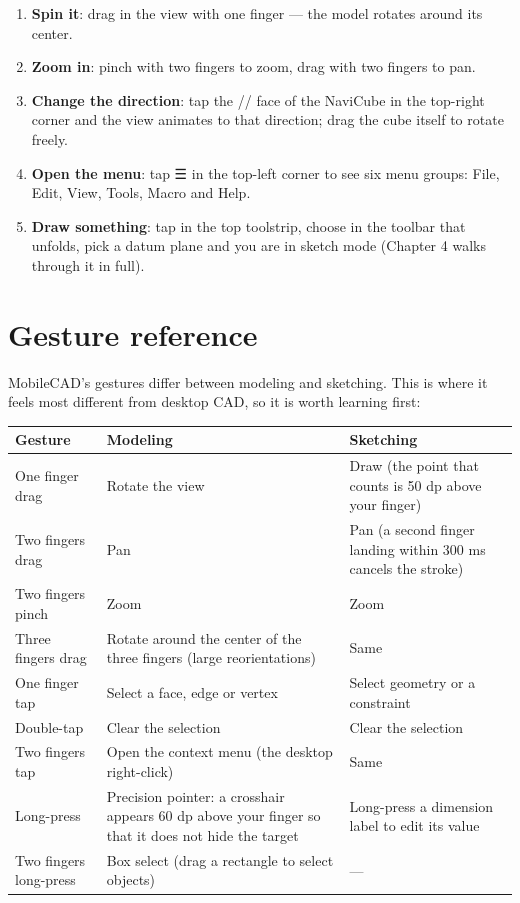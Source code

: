 \begin{enumerate}
  \item \textbf{Spin it}: drag in the view with one finger — the model rotates around its center.
  \item \textbf{Zoom in}: pinch with two fingers to zoom, drag with two fingers to pan.
  \item \textbf{Change the direction}: tap the // face of the NaviCube in the
        top-right corner and the view animates to that direction; drag the cube itself to rotate freely.
  \item \textbf{Open the menu}: tap ☰ in the top-left corner to see six menu groups: File, Edit, View, Tools,
        Macro and Help.
  \item \textbf{Draw something}: tap  in the top toolstrip, choose  in the toolbar
        that unfolds, pick a datum plane and you are in sketch mode (Chapter 4 walks through it in full).
\end{enumerate}

\section{Gesture reference}

MobileCAD's gestures differ between modeling and sketching. This is where it feels most different from
desktop CAD, so it is worth learning first:

\begin{center}
\small
\begin{tabularx}{\linewidth}{@{}lXX@{}}
\toprule
\textbf{Gesture} & \textbf{Modeling} & \textbf{Sketching} \\
\midrule
One finger drag & Rotate the view & Draw (the point that counts is 50 dp above your finger) \\
Two fingers drag & Pan & Pan (a second finger landing within 300 ms cancels the stroke) \\
Two fingers pinch & Zoom & Zoom \\
Three fingers drag & Rotate around the center of the three fingers (large reorientations) & Same \\
One finger tap & Select a face, edge or vertex & Select geometry or a constraint \\
Double-tap & Clear the selection & Clear the selection \\
Two fingers tap & Open the context menu (the desktop right-click) & Same \\
Long-press & Precision pointer: a crosshair appears 60 dp above your finger so that it does not hide the
target & Long-press a dimension label to edit its value \\
Two fingers long-press & Box select (drag a rectangle to select objects) & — \\
\bottomrule
\end{tabularx}
\end{center}

